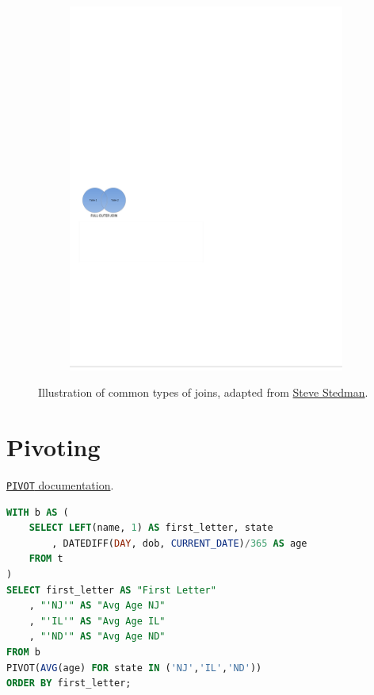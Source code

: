 \begin{figure}[H]
\begin{subfigure}[c]{0.3\textwidth}
  \includegraphics[width=\textwidth]{figures/sql/full_outer_join}
  \label{fig:sql:joins:full_outer_join}
  \end{subfigure}
\caption{
Illustration of common types of joins,
adapted from \href{http://stevestedman.com/2015/03/sql-server-join-types-poster-version-2}{Steve Stedman}.
}
\label{fig:sql:joins}
\end{figure}

\section{Pivoting}
\label{ssql:pivoting}

\noindent \href{https://docs.snowflake.com/en/sql-reference/constructs/pivot.html}{\texttt{PIVOT} documentation}.

\begin{lstlisting}[language=SQL]
WITH b AS (
	SELECT LEFT(name, 1) AS first_letter, state
		, DATEDIFF(DAY, dob, CURRENT_DATE)/365 AS age
	FROM t
)
SELECT first_letter AS "First Letter"
	, "'NJ'" AS "Avg Age NJ"
	, "'IL'" AS "Avg Age IL"
	, "'ND'" AS "Avg Age ND"
FROM b
PIVOT(AVG(age) FOR state IN ('NJ','IL','ND'))
ORDER BY first_letter;
\end{lstlisting}

